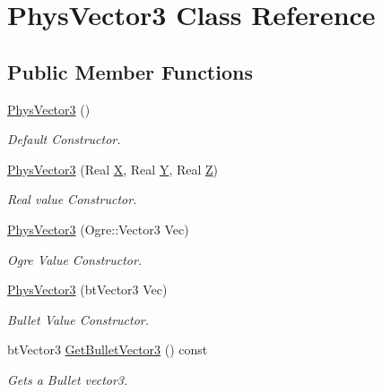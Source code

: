 \hypertarget{classPhysVector3}{
\section{PhysVector3 Class Reference}
\label{da/d11/classPhysVector3}
}
\subsection*{Public Member Functions}
\begin{DoxyCompactItemize}
\item 
\hyperlink{classPhysVector3_a0d68895a6479ed7f875f666ce381afba}{PhysVector3} ()
\begin{DoxyCompactList}\small\item\em Default Constructor. \item\end{DoxyCompactList}\item 
\hyperlink{classPhysVector3_a0fd6687cacb095a14a398fd88a33d76a}{PhysVector3} (Real \hyperlink{classPhysVector3_a8fb29119f25c996da9d091fd6ce5693f}{X}, Real \hyperlink{classPhysVector3_a45b7fdd4361f9e31b36eab4551c1e558}{Y}, Real \hyperlink{classPhysVector3_a728c752b813e3191231904f629050a74}{Z})
\begin{DoxyCompactList}\small\item\em Real value Constructor. \item\end{DoxyCompactList}\item 
\hyperlink{classPhysVector3_a6a039f4d76279874f44b0c8b52a2ac48}{PhysVector3} (Ogre::Vector3 Vec)
\begin{DoxyCompactList}\small\item\em Ogre Value Constructor. \item\end{DoxyCompactList}\item 
\hyperlink{classPhysVector3_a09399e22695bed8c4742e9b62c4e7525}{PhysVector3} (btVector3 Vec)
\begin{DoxyCompactList}\small\item\em Bullet Value Constructor. \item\end{DoxyCompactList}\item 
btVector3 \hyperlink{classPhysVector3_a7109b1bf54cae678e5cada4e82482918}{GetBulletVector3} () const 
\begin{DoxyCompactList}\small\item\em Gets a Bullet vector3. \item\end{DoxyCompactList}\item 

\end{DoxyCompactItemize}
